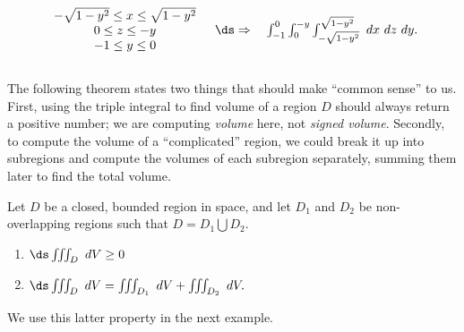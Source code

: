 {$$\begin{array}{cc}
		\begin{array}{c}
		-\sqrt{1-y^2}\leq x\leq \sqrt{1-y^2}\\
		0\leq z\leq -y\\
		-1\leq y\leq 0
		\end{array} 
		&
		\ds\Rightarrow \quad \int_{-1}^0\int_{0}^{-y}\int_{-\sqrt{1-y^2}}^{\sqrt{1-y^2}}\ dx\ dz\ dy.
	\end{array}
$$
}\\

The following theorem states two things that should make ``common sense'' to us. First, using the triple integral to find volume of a region $D$ should always return a positive number; we are computing \textit{volume} here, not \textit{signed volume}. Secondly, to compute the volume of a ``complicated'' region, we could break it up into subregions and compute the volumes of each subregion separately, summing them later to find the total volume.\\

{Let $D$ be a closed, bounded region in space, and let $D_1$ and $D_2$ be non-overlapping regions such that $D=D_1\bigcup D_2$.
\begin{enumerate}
	\item $\ds \iiint_D \ dV \geq 0$
	\item	$\ds \iiint_D\ dV = \iiint_{D_1}\ dV + \iiint_{D_2}\ dV.$
\end{enumerate}
}

We use this latter property in the next example.\\

